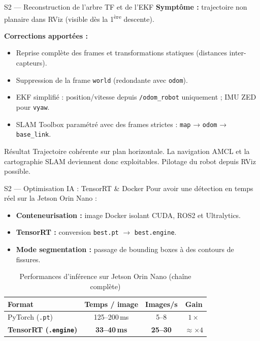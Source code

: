 \documentclass[aspectratio=169]{beamer}
\begin{document}
\begin{frame}{S2 — Reconstruction de l'arbre TF et de l'EKF}
    \textbf{Symptôme :} trajectoire non planaire dans RViz (visible dès la 1\textsuperscript{ère} descente).

    \vspace{0.3cm}
    \textbf{Corrections apportées :}
    \begin{itemize}
        \item Reprise complète des frames et transformations statiques (distances inter-capteurs).
        \item Suppression de la frame \texttt{world} (redondante avec \texttt{odom}).
        \item EKF simplifié : position/vitesse depuis \texttt{/odom\_robot} uniquement ; IMU ZED pour \texttt{vyaw}.
        \item SLAM Toolbox paramétré avec des frames strictes : \texttt{map} → \texttt{odom} → \texttt{base\_link}.
    \end{itemize}
    \vspace{0.2cm}
    \begin{block}{Résultat}
        Trajectoire cohérente sur plan horizontale. La navigation AMCL et la cartographie SLAM deviennent donc exploitables. Pilotage du robot depuis RViz possible.
    \end{block}
\end{frame}

\begin{frame}{S2 — Optimisation IA : TensorRT \& Docker}
    Pour avoir une détection en temps réel sur la Jetson Orin Nano :
    \begin{itemize}
        \item \textbf{Conteneurisation :} image Docker isolant CUDA, ROS2 et Ultralytics.
        \item \textbf{TensorRT :} conversion \texttt{best.pt} $\rightarrow$ \texttt{best.engine}.
        \item \textbf{Mode segmentation :} passage de bounding boxes à des contours de fissures.
    \end{itemize}
    \vspace{0.5cm}
    \begin{table}
        \centering
        \begin{tabular}{lccc}
            \toprule
            \textbf{Format} & \textbf{Temps / image} & \textbf{Images/s} & \textbf{Gain} \\
            \midrule
            PyTorch (\texttt{.pt}) & 125--200\,ms & 5--8 & $1\times$ \\
            \textbf{TensorRT (\texttt{.engine})} & \textbf{33--40\,ms} & \textbf{25--30} & \textbf{$\approx\times4$} \\
            \bottomrule
        \end{tabular}
        \caption{Performances d'inférence sur Jetson Orin Nano (chaîne complète)}
    \end{table}
\end{frame}
\end{document}
